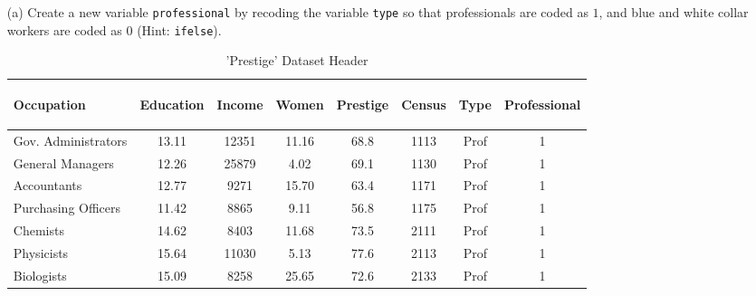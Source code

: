 \documentclass[12pt,letterpaper]{article}
\begin{document}
\newpage
\begin{enumerate}
	
	\item [(a)]
	Create a new variable \texttt{professional} by recoding the variable \texttt{type} so that professionals are coded as $1$, and blue and white collar workers are coded as $0$ (Hint: \texttt{ifelse}).

	 

\begin{table}[H]
	\centering
	\caption{'Prestige' Dataset Header}
	\label{tab:prestige_dataset_header}
	\scriptsize
	\begin{adjustbox}{width=0.9\textwidth}
		\begin{tabular}{lccccccc}
			\begin{turn}{45}\textbf{Occupation}\end{turn} & \begin{turn}{45}\textbf{Education}\end{turn} & \begin{turn}{45}\textbf{Income}\end{turn} & \begin{turn}{45}\textbf{Women}\end{turn} & \begin{turn}{45}\textbf{Prestige}\end{turn} & \begin{turn}{45}\textbf{Census}\end{turn} & \begin{turn}{45}\textbf{Type}\end{turn} & \begin{turn}{45}\textbf{Professional}\end{turn} \\
			\hline
			Gov. Administrators & 13.11 & 12351 & 11.16 & 68.8 & 1113 & Prof & 1 \\
			General Managers & 12.26 & 25879 & 4.02 & 69.1 & 1130 & Prof & 1 \\
			Accountants & 12.77 & 9271 & 15.70 & 63.4 & 1171 & Prof & 1 \\
			Purchasing Officers & 11.42 & 8865 & 9.11 & 56.8 & 1175 & Prof & 1 \\
			Chemists & 14.62 & 8403 & 11.68 & 73.5 & 2111 & Prof & 1 \\
			Physicists & 15.64 & 11030 & 5.13 & 77.6 & 2113 & Prof & 1 \\
			Biologists & 15.09 & 8258 & 25.65 & 72.6 & 2133 & Prof & 1 \\

\end{tabular}
\end{adjustbox}
\end{table}
\end{enumerate}
\end{document}
